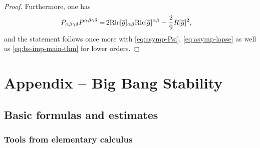 \documentclass[11pt,leqno,textwidth=10cm]{amsart}
\numberwithin{equation}{section}
\theoremstyle{definition}
\theoremstyle{plain}
\newcommand{\1}{\mathbbm{1}}
\newcommand{\g}{\overline{g}}
\newcommand{\Ric}{\text{\normalfont{Ric}}}
\newcommand{\del}{\partial}
\newcommand{\deletemath}[1]{}
\begin{document}
\begin{proof}
Furthermore, %
one has 
\begin{align*}
P_{\alpha\beta\gamma\delta}P^{\alpha\beta\gamma\delta}%
=&\,2\Ric[\g]_{\alpha\beta}\Ric[\g]^{\alpha\beta}-\frac29 R[\g]^2\deletemath{-\frac16R[\g]},\,
\end{align*}
and the statement follows once more with \eqref{eq:asymp-Psi}, \eqref{eq:asymp-lapse} as well as \eqref{eq:bs-imp-main-thm} for lower orders.
\end{proof}



\section{Appendix -- Big Bang Stability}\label{sec:appendix}

\subsection{Basic formulas and estimates}\label{subsec:basic}

\subsubsection{Tools from elementary calculus}
\end{document}
